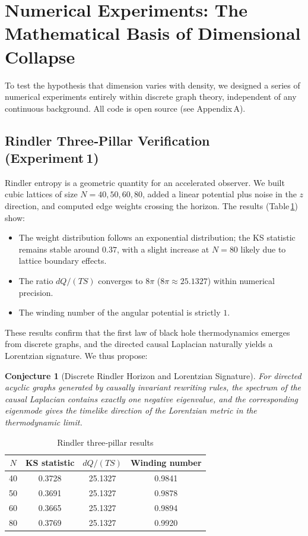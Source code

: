 \documentclass[12pt,a4paper]{article}
\newtheorem{conjecture}[theorem]{Conjecture}
\begin{document}
\section{Numerical Experiments: The Mathematical Basis of Dimensional Collapse}
To test the hypothesis that dimension varies with density, we designed a series of numerical experiments entirely within discrete graph theory, independent of any continuous background. All code is open source (see Appendix A).

\subsection{Rindler Three‑Pillar Verification (Experiment 1)}
Rindler entropy is a geometric quantity for an accelerated observer. We built cubic lattices of size $N=40,50,60,80$, added a linear potential plus noise in the $z$ direction, and computed edge weights crossing the horizon. The results (Table \ref{tab:rindler}) show:
\begin{itemize}
    \item The weight distribution follows an exponential distribution; the KS statistic remains stable around $0.37$, with a slight increase at $N=80$ likely due to lattice boundary effects.
    \item The ratio $dQ/(T S)$ converges to $8\pi$ ($8\pi\approx25.1327$) within numerical precision.
    \item The winding number of the angular potential is strictly $1$.
\end{itemize}
These results confirm that the first law of black hole thermodynamics emerges from discrete graphs, and the directed causal Laplacian naturally yields a Lorentzian signature. We thus propose:

\begin{conjecture}[Discrete Rindler Horizon and Lorentzian Signature]
For directed acyclic graphs generated by causally invariant rewriting rules, the spectrum of the causal Laplacian contains exactly one negative eigenvalue, and the corresponding eigenmode gives the timelike direction of the Lorentzian metric in the thermodynamic limit.
\end{conjecture}

\begin{table}[htbp]
\centering
\caption{Rindler three‑pillar results}
\label{tab:rindler}
\begin{tabular}{cccc}
\toprule
$N$ & KS statistic & $dQ/(T S)$ & Winding number \\
\midrule
40 & 0.3728 & 25.1327 & 0.9841 \\
50 & 0.3691 & 25.1327 & 0.9878 \\
60 & 0.3665 & 25.1327 & 0.9894 \\
80 & 0.3769 & 25.1327 & 0.9920 \\
\bottomrule
\end{tabular}
\end{table}
\end{document}
